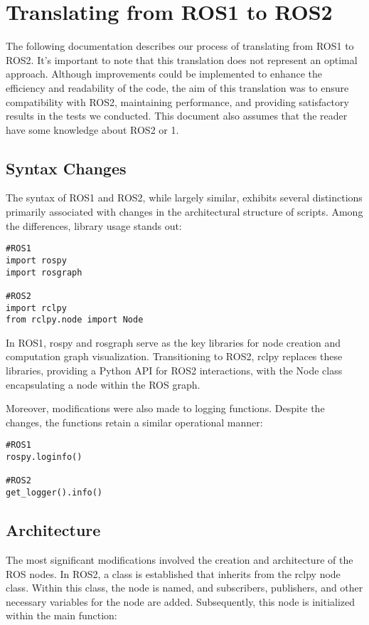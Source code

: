 \section{Translating from ROS1 to ROS2}

The following documentation describes our process of translating from ROS1 to ROS2. It's important to note that this translation does not represent an optimal approach. Although improvements could be implemented to enhance the efficiency and readability of the code, the aim of this translation was to ensure compatibility with ROS2, maintaining performance, and providing satisfactory results in the tests we conducted. This document also assumes that the reader have some knowledge about ROS2 or 1.

\subsection{Syntax Changes}

The syntax of ROS1 and ROS2, while largely similar, exhibits several distinctions primarily associated with changes in the architectural structure of scripts. Among the differences, library usage stands out:

\begin{lstlisting}[language=PythonPlus]
#ROS1
import rospy
import rosgraph

#ROS2
import rclpy
from rclpy.node import Node
\end{lstlisting}

In ROS1, rospy and rosgraph serve as the key libraries for node creation and computation graph visualization. Transitioning to ROS2, rclpy replaces these libraries, providing a Python API for ROS2 interactions, with the Node class encapsulating a node within the ROS graph.

Moreover, modifications were also made to logging functions. Despite the changes, the functions retain a similar operational manner:

\begin{lstlisting}[language=PythonPlus]
#ROS1
rospy.loginfo()

#ROS2
get_logger().info()
\end{lstlisting}

\subsection{Architecture}

The most significant modifications involved the creation and architecture of the ROS nodes. In ROS2, a class is established that inherits from the rclpy node class. Within this class, the node is named, and subscribers, publishers, and other necessary variables for the node are added. Subsequently, this node is initialized within the main function:

